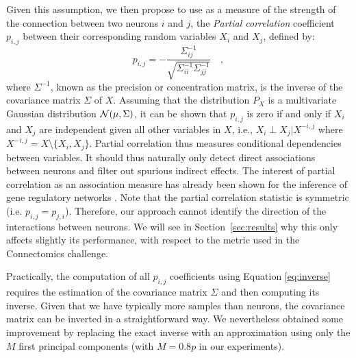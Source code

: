 \documentclass[wcp]{jmlr}
\begin{document}
Given this assumption, we then propose to use as a measure of the
strength of the connection between two neurons $i$ and $j$, the
\textit{Partial correlation} coefficient $p_{i,j}$ between their corresponding
random variables $X_i$ and $X_j$, defined by:
\begin{equation}
p_{i,j} =
-\frac{\Sigma^{-1}_{ij}}{\sqrt{\Sigma^{-1}_{ii} \Sigma^{-1}_{jj}}}\quad, \label{eq:inverse}
\end{equation}
where $\Sigma^{-1}$, known as the precision or concentration matrix, is the inverse of the covariance matrix $\Sigma$ of $X$. %
Assuming that the distribution $P_X$ is a multivariate Gaussian
distribution ${\cal N}(\mu,\Sigma)$, it can be shown that $p_{i,j}$ is
zero if and only if $X_i$ and $X_j$ are independent given all other
variables in $X$, i.e., $X_i \perp X_j|X^{-i,j}$ where $X^{-i,j}= X
\setminus\{X_i,X_j\}$. Partial correlation thus measures conditional
dependencies between variables. It should thus naturally only detect direct associations
between neurons and filter out spurious indirect effects. The interest
of partial correlation as an association measure has already been
shown for the inference of gene regulatory networks
\citep{de2004discovery,Schafer:2005}.
Note that the partial correlation statistic is symmetric
(i.e. $p_{i,j}=p_{j,i}$). Therefore, our approach cannot identify the
direction of the interactions between neurons. We will see in
Section~\ref{sec:results} why this only affects slightly its
performance, with respect to the metric used in the Connectomics
challenge.

Practically, the computation of all $p_{i,j}$ coefficients using Equation
\ref{eq:inverse} requires the estimation of the covariance matrix $\Sigma$
and then computing its inverse. Given that we have typically more
samples than neurons, the covariance matrix can be inverted in a
straightforward way. We nevertheless obtained some improvement by
replacing the exact inverse with an approximation using only the $M$
first principal components \citep{bishop2006pattern} (with
$M=0.8 p$ in our experiments).
\end{document}

